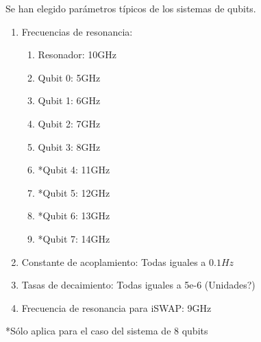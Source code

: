Se han elegido parámetros típicos de los sistemas de qubits\cite{blais}.

\begin{enumerate}
    \item Frecuencias de resonancia:
        \begin{enumerate}
            \item Resonador: 10GHz
            \item Qubit 0: 5GHz
            \item Qubit 1: 6GHz
            \item Qubit 2: 7GHz
            \item Qubit 3: 8GHz
            \item *Qubit 4: 11GHz
            \item *Qubit 5: 12GHz
            \item *Qubit 6: 13GHz
            \item *Qubit 7: 14GHz
        \end{enumerate}
    \item Constante de acoplamiento: Todas iguales a $0.1 Hz$
    \item Tasas de decaimiento: Todas iguales a 5e-6 (Unidades?)
    \item Frecuencia de resonancia para iSWAP: 9GHz
\end{enumerate}

*Sólo aplica para el caso del sistema de 8 qubits

